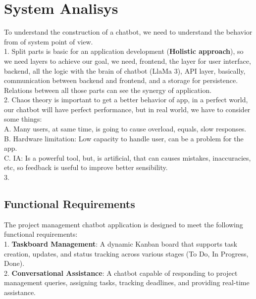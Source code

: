 \documentclass[conference]{IEEEtran}
\begin{document}
	\section{System Analisys}
	To understand the construction of a chatbot, we need to understand the behavior from of system point of view.\\
	
	1. Split parts is basic for an application development (\textbf{Holistic approach}), so we need layers to achieve our goal, we need, frontend, the layer for user interface, backend, all the logic with the brain of chatbot (LlaMa 3), API layer, basically, communication between backend and frontend, and a storage for persistence. \\
	
	Relations between all those parts can see the synergy of application.\\
	
	2. Chaos theory is important to get a better behavior of app, in a perfect world, our chatbot will have perfect performance, but in real world, we have to consider some things:\\
	
		A. Many users, at same time, is going to cause overload, equals, slow responses.\\
		
		B. Hardware limitation: Low capacity to handle user, can be a problem for the app.\\
		
		C. IA: Is a powerful tool, but, is artificial, that can causes mistakes, inaccuracies, etc, so feedback is useful to improve better sensibility. \\
		
	
	3. 
	
	\subsection{Functional Requirements}
	The project management chatbot application is designed to meet the following functional requirements:\\
	1. \textbf{Taskboard Management}: A dynamic Kanban board that supports task creation, updates, and status tracking across various stages (To Do, In Progress, Done).\\
	
	2. \textbf{Conversational Assistance}: A chatbot capable of responding to project management queries, assigning tasks, tracking deadlines, and providing real-time assistance.\\
	
\end{document}
